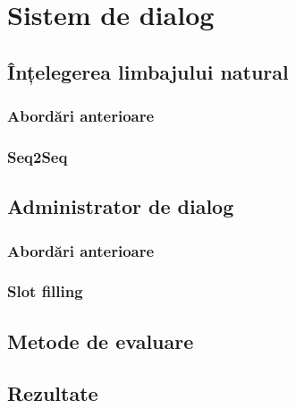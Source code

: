\chapter{Sistem de dialog}

\section{Înțelegerea limbajului natural}

\subsection{Abordări anterioare}

\subsection{Seq2Seq}


\section{Administrator de dialog}

\subsection{Abordări anterioare}

\subsection{Slot filling}

\section{Metode de evaluare}

\section{Rezultate}